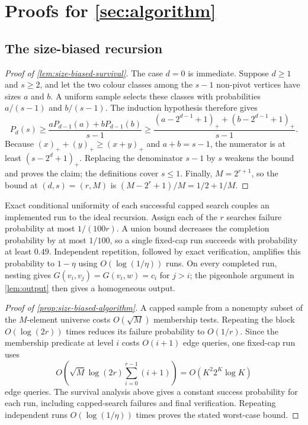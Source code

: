 \section{Proofs for \texorpdfstring{\cref{sec:algorithm}}{Section 3}}
\label{app:upper-proofs}

\subsection{The size-biased recursion}

\begin{proof}[Proof of \cref{lem:size-biased-survival}]
The case $d=0$ is immediate.  Suppose $d\ge1$ and $s\ge2$, and let the two
colour classes among the $s-1$ non-pivot vertices have sizes $a$ and $b$.
A uniform sample selects these classes with probabilities $a/(s-1)$ and
$b/(s-1)$.  The induction hypothesis therefore gives
\[
 P_d(s)\ge
 \frac{aP_{d-1}(a)+bP_{d-1}(b)}{s-1}
 \ge
 \frac{(a-2^{d-1}+1)_+ +(b-2^{d-1}+1)_+}{s-1}.
\]
Because $(x)_++(y)_+\ge(x+y)_+$ and $a+b=s-1$, the numerator is at least
$(s-2^d+1)_+$.  Replacing the denominator $s-1$ by $s$ weakens the bound and
proves the claim; the definitions cover $s\le1$.  Finally, $M=2^{r+1}$, so
the bound at $(d,s)=(r,M)$ is
$(M-2^r+1)/M=1/2+1/M$.
\end{proof}

Exact conditional uniformity of each successful capped search couples an
implemented run to the ideal recursion.  Assign each of the $r$ searches
failure probability at most $1/(100r)$.  A union bound decreases the
completion probability by at most $1/100$, so a single fixed-cap run succeeds
with probability at least $0.49$.  Independent repetition, followed by exact
verification, amplifies this probability to $1-\eta$ using
$O(\log(1/\eta))$ runs.  On every completed run, nesting gives
$G(v_i,v_j)=G(v_i,w)=c_i$ for $j>i$; the pigeonhole argument in
\cref{lem:output} then gives a homogeneous output.

\begin{proof}[Proof of \cref{prop:size-biased-algorithm}]
A capped sample from a nonempty subset of the $M$-element universe costs
$O(\sqrt M)$ membership tests.  Repeating the block $O(\log(2r))$ times
reduces its failure probability to $O(1/r)$.  Since the membership predicate
at level $i$ costs $O(i+1)$ edge queries, one fixed-cap run uses
\[
 O\!\left(\sqrt M\log(2r)\sum_{i=0}^{r-1}(i+1)\right)
 =O(K^2 2^K\log K)
\]
edge queries.  The survival analysis above gives a constant success
probability for each run, including capped-search failures and final
verification.  Repeating independent runs $O(\log(1/\eta))$ times proves the
stated worst-case bound.
\end{proof}


